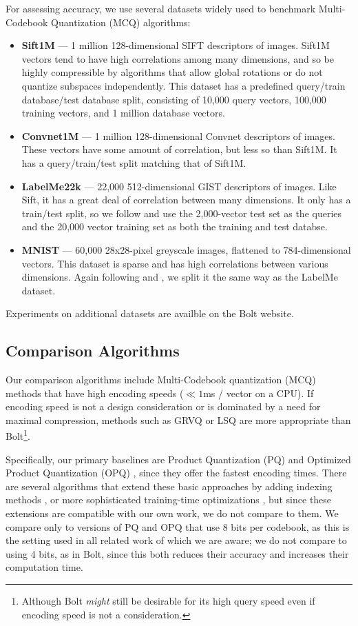 For assessing accuracy, we use several datasets widely used to benchmark Multi-Codebook Quantization (MCQ) algorithms:
\begin{itemize}
\item \textbf{Sift1M} \cite{pq} --- 1 million 128-dimensional SIFT descriptors of images. Sift1M vectors tend to have high correlations among many dimensions, and so be highly compressible by algorithms that allow global rotations or do not quantize subspaces independently. This dataset has a predefined query/train database/test database split, consisting of 10,000 query vectors, 100,000 training vectors, and 1 million database vectors.
\item \textbf{Convnet1M} \cite{stackedQuantizers} --- 1 million 128-dimensional Convnet descriptors of images. These vectors have some amount of correlation, but less so than Sift1M. It has a query/train/test split matching that of Sift1M.
\item \textbf{LabelMe22k} \cite{minimalLossHashing} --- 22,000 512-dimensional GIST descriptors of images. Like Sift, it has a great deal of correlation between many dimensions. It only has a train/test split, so we follow \cite{lsq, cq} and use the 2,000-vector test set as the queries and the 20,000 vector training set as both the training and test databse.
\item \textbf{MNIST} \cite{mnist} --- 60,000 28x28-pixel greyscale images, flattened to 784-dimensional vectors. This dataset is sparse and has high correlations between various dimensions. Again following \cite{lsq} and \cite{cq}, we split it the same way as the LabelMe dataset.
\end{itemize}

Experiments on additional datasets are availble on the Bolt website.

\subsection{Comparison Algorithms}

Our comparison algorithms include Multi-Codebook quantization (MCQ) methods that have high encoding speeds ($\ll 1$ms / vector on a CPU). If encoding speed is not a design consideration or is dominated by a need for maximal compression, methods such as GRVQ \cite{grvq} or LSQ \cite{lsq} are more appropriate than Bolt\footnote{Although Bolt \textit{might} still be desirable for its high query speed even if encoding speed is not a consideration.}.

Specifically, our primary baselines are Product Quantization (PQ) \cite{pq} and Optimized Product Quantization (OPQ) \cite{opq}, since they offer the fastest encoding times. There are several algorithms that extend these basic approaches by adding indexing methods \cite{lopq, NOIMI}, or more sophisticated training-time optimizations \cite{googleMips, pairQ, polysemous}, but since these extensions are compatible with our own work, we do not compare to them. We compare only to versions of PQ and OPQ that use 8 bits per codebook, as this is the setting used in all related work of which we are aware; we do not compare to using 4 bits, as in Bolt, since this both reduces their accuracy and increases their computation time.

